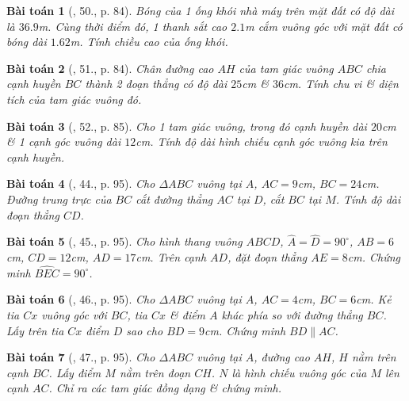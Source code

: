 \documentclass{article}
\newtheorem{baitoan}{Bài toán}
\begin{document}
\begin{baitoan}[\cite{SGK_Toan_8_tap_2}, 50., p. 84]
	Bóng của 1 ống khói nhà máy trên mặt đất có độ dài là $36.9$\emph{m}. Cùng thời điểm đó, 1 thanh sắt cao $2.1$\emph{m} cắm vuông góc với mặt đất có bóng dài $1.62$\emph{m}. Tính chiều cao của ống khói.
\end{baitoan}

\begin{baitoan}[\cite{SGK_Toan_8_tap_2}, 51., p. 84]
	Chân đường cao $AH$ của tam giác vuông $ABC$ chia cạnh huyền $BC$ thành 2 đoạn thẳng có độ dài $25$\emph{cm} \& $36$\emph{cm}. Tính chu vi \& diện tích của tam giác vuông đó.
\end{baitoan}

\begin{baitoan}[\cite{SGK_Toan_8_tap_2}, 52., p. 85]
	Cho 1 tam giác vuông, trong đó cạnh huyền dài $20$\emph{cm} \& 1 cạnh góc vuông dài $12$\emph{cm}. Tính độ dài hình chiếu cạnh góc vuông kia trên cạnh huyền.
\end{baitoan}

\begin{baitoan}[\cite{SBT_Toan_8_tap_2}, 44., p. 95]
	Cho $\Delta ABC$ vuông tại $A$, $AC = 9$\emph{cm}, $BC = 24$\emph{cm}. Đường trung trực của $BC$ cắt đường thẳng $AC$ tại $D$, cắt $BC$ tại $M$. Tính độ dài đoạn thẳng $CD$.
\end{baitoan}

\begin{baitoan}[\cite{SBT_Toan_8_tap_2}, 45., p. 95]
	Cho hình thang vuông $ABCD$, $\widehat{A} = \widehat{D} = 90^\circ$, $AB = 6$\emph{cm}, $CD = 12$\emph{cm}, $AD = 17$\emph{cm}. Trên cạnh $AD$, đặt đoạn thẳng $AE = 8$\emph{cm}. Chứng minh $\widehat{BEC} = 90^\circ$.
\end{baitoan}

\begin{baitoan}[\cite{SBT_Toan_8_tap_2}, 46., p. 95]
	Cho $\Delta ABC$ vuông tại $A$, $AC = 4$\emph{cm}, $BC = 6$\emph{cm}. Kẻ tia $Cx$ vuông góc với $BC$, tia $Cx$ \& điểm $A$ khác phía so với đường thẳng $BC$. Lấy trên tia $Cx$ điểm $D$ sao cho $BD = 9$\emph{cm}. Chứng minh $BD\parallel AC$.
\end{baitoan}

\begin{baitoan}[\cite{SBT_Toan_8_tap_2}, 47., p. 95]
	Cho $\Delta ABC$ vuông tại $A$, đường cao $AH$, $H$ nằm trên cạnh $BC$. Lấy điểm $M$ nằm trên đoạn $CH$. $N$ là hình chiếu vuông góc của $M$ lên cạnh $AC$. Chỉ ra các tam giác đồng dạng \& chứng minh.
\end{baitoan}
\end{document}

